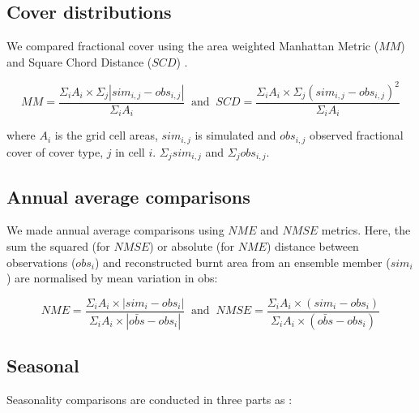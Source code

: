 \subsection{Cover distributions}
We compared fractional cover using the area weighted Manhattan Metric ($MM$) and Square Chord Distance ($SCD$) \citep{Kelley2013-ey}.

\begin{equation}
    MM = \frac{\Sigma_i A_i \times \Sigma_j  |sim_{i,j} - obs_{i,j} |}{\Sigma_i A_i} \  \text{   and   } \
    SCD = \frac{\Sigma_i A_i \times \Sigma_j (sim_{i,j} - obs_{i,j} )^2}{\Sigma_i A_i}
\end{equation}

where $A_i$ is the grid cell areas, $sim_{i,j}$ is simulated and $obs_{i,j}$ observed fractional cover of cover type, $j$ in cell $i$. $\Sigma_j sim_{i,j}$ and $\Sigma_j obs_{i,j}$.

\subsection{Annual average comparisons}
We made annual average comparisons using $NME$ and $NMSE$ metrics. Here, the sum the squared (for $NMSE$) or absolute (for $NME$) distance between observations ($obs_i$) and reconstructed burnt area from an ensemble member ($sim_i$) are normalised by mean variation in obs:

\begin{equation}
    NME = \frac{\Sigma_i A_i \times  |sim_i - obs_i |}{\Sigma_i A_i \times |\bar{obs} - obs_i |} \  \text{   and   } \
    NMSE = \frac{\Sigma_i A_i \times  (sim_i- obs_i) }{\Sigma_i A_i \times (\bar{obs} - obs_i )}
\end{equation}

\subsection{Seasonal}
Seasonality comparisons are conducted in three parts as  \citet{kelley2013comprehensive, kelley2021low}:

